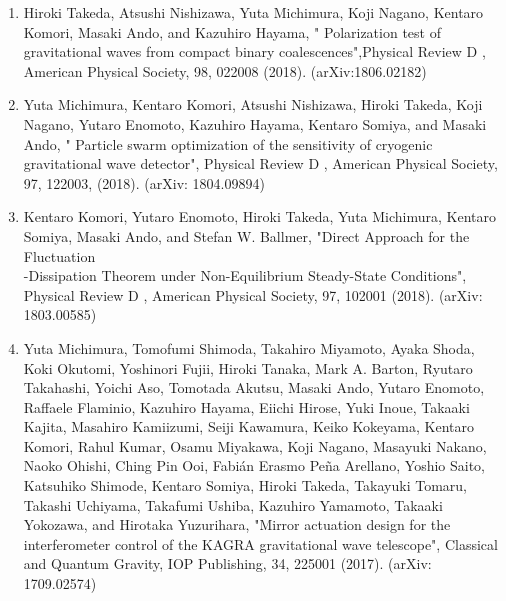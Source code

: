 \documentclass[uplatex, 12pt,a4paper]{jsarticle}
\begin{document}
\begin{enumerate}
\item Hiroki Takeda, Atsushi Nishizawa, Yuta Michimura, Koji Nagano, Kentaro Komori, Masaki Ando, and Kazuhiro Hayama, " Polarization test of gravitational waves from compact binary coalescences",Physical Review D , American Physical Society, 98, 022008 (2018). (arXiv:1806.02182)
\item Yuta Michimura, Kentaro Komori, Atsushi Nishizawa, Hiroki Takeda, Koji Nagano, Yutaro Enomoto, Kazuhiro Hayama, Kentaro Somiya, and Masaki Ando, " Particle swarm optimization of the sensitivity of cryogenic gravitational wave detector", Physical Review D , American Physical Society, 97, 122003, (2018). (arXiv: 1804.09894)
\item Kentaro Komori, Yutaro Enomoto, Hiroki Takeda, Yuta Michimura, Kentaro Somiya, Masaki Ando, and Stefan W. Ballmer, "Direct Approach for the Fluctuation\\-Dissipation Theorem under Non-Equilibrium Steady-State Conditions", Physical Review D , American Physical Society, 97, 102001 (2018). (arXiv: 1803.00585)
\item Yuta Michimura, Tomofumi Shimoda, Takahiro Miyamoto, Ayaka Shoda, Koki Okutomi, Yoshinori Fujii, Hiroki Tanaka, Mark A. Barton, Ryutaro Takahashi, Yoichi Aso, Tomotada Akutsu, Masaki Ando, Yutaro Enomoto, Raffaele Flaminio, Kazuhiro Hayama, Eiichi Hirose, Yuki Inoue, Takaaki Kajita, Masahiro Kamiizumi, Seiji Kawamura, Keiko Kokeyama, Kentaro Komori, Rahul Kumar, Osamu Miyakawa, Koji Nagano, Masayuki Nakano, Naoko Ohishi, Ching Pin Ooi, Fabián Erasmo Peña Arellano, Yoshio Saito, Katsuhiko Shimode, Kentaro Somiya, Hiroki Takeda, Takayuki Tomaru, Takashi Uchiyama, Takafumi Ushiba, Kazuhiro Yamamoto, Takaaki Yokozawa, and Hirotaka Yuzurihara, "Mirror actuation design for the interferometer control of the KAGRA gravitational wave telescope", Classical and Quantum Gravity, IOP Publishing, 34, 225001 (2017). (arXiv: 1709.02574)
\end{enumerate}
\end{document}
